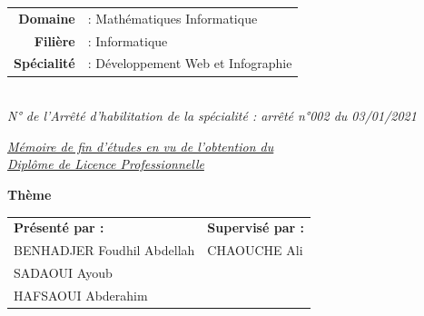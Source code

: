 \documentclass[12pt,a4paper]{report}
\begin{document}
\begin{titlepage}
\begin{center}
    \begin{tabular}{rl}
        \textbf{Domaine} & : Mathématiques Informatique \\
        \textbf{Filière} & : Informatique \\
        \textbf{Spécialité} & : Développement Web et Infographie \\
    \end{tabular} \\
    
    {\small \textit{N° de l'Arrêté d'habilitation de la spécialité : arrêté n°002 du 03/01/2021}} \\
    \vspace{0.7cm}
    
    {\large \textit{\underline{Mémoire de fin d'études en vu de l'obtention du}}} \\
    {\large \textit{\underline{Diplôme de Licence Professionnelle}}} \\
    \vspace{0.7cm}
    
    {\LARGE \textbf{Thème}} \\
    \vspace{0.6cm}
    
    \vspace{0.8cm}

    \begin{tabular}{p{8cm}p{6cm}}
        \textbf{Présenté par :} & \textbf{Supervisé par :} \\
        BENHADJER Foudhil Abdellah & CHAOUCHE Ali \\
        SADAOUI Ayoub & \\
        HAFSAOUI Abderahim & \\
    \end{tabular} \\
    \vspace{0.8cm}


\end{center}
\end{titlepage}
\end{document}
